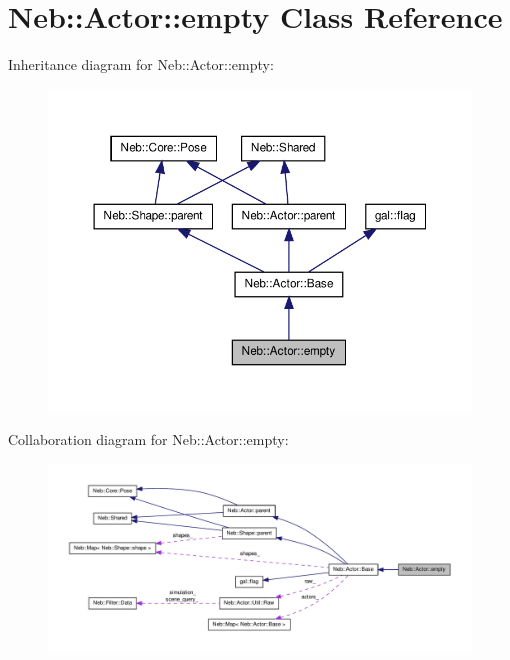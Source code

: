 \hypertarget{classNeb_1_1Actor_1_1empty}{\section{\-Neb\-:\-:\-Actor\-:\-:empty \-Class \-Reference}
\label{classNeb_1_1Actor_1_1empty}
}


\-Inheritance diagram for \-Neb\-:\-:\-Actor\-:\-:empty\-:\nopagebreak
\begin{figure}[H]
\begin{center}
\leavevmode
\includegraphics[width=350pt]{classNeb_1_1Actor_1_1empty__inherit__graph}
\end{center}
\end{figure}


\-Collaboration diagram for \-Neb\-:\-:\-Actor\-:\-:empty\-:\nopagebreak
\begin{figure}[H]
\begin{center}
\leavevmode
\includegraphics[width=350pt]{classNeb_1_1Actor_1_1empty__coll__graph}
\end{center}
\end{figure}
